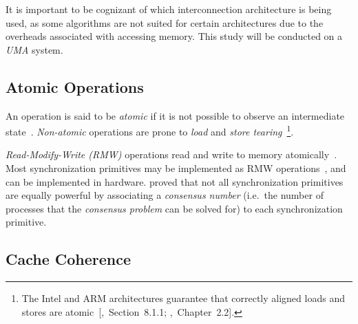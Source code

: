 It is important to be cognizant of which interconnection architecture is being
used, as some algorithms are not suited for certain architectures due to the
overheads associated with accessing memory. This study will be
conducted on a \emph{UMA} system.

\subsection{Atomic Operations}
An operation is said to be \emph{atomic} if it is not possible to observe an
intermediate state~\citep{perfbook2021}. \emph{Non-atomic} operations
are prone to \emph{load} and \emph{store
tearing}~\citep[Section~4.3.4]{perfbook2021}\footnote{The Intel and ARM
architectures guarantee that correctly aligned loads and stores are
atomic~[\citealp{intel2021system},~Section~8.1.1; \citealp{arm2022architecture},~Chapter~2.2].}.

\emph{Read-Modify-Write (RMW)} operations read and write to memory
atomically~\citep{perfbook2021}. Most synchronization primitives may be
implemented as RMW operations~\citep[Section~5.6]{herlihy2020art}, and can be
implemented in hardware.
\citeauthor{herlihy1991wait} proved that not all synchronization primitives are
equally powerful by associating a \emph{consensus number} (i.e.~the number of
processes that the \emph{consensus problem} can be solved for) to each
synchronization primitive.






\subsection{Cache Coherence}

